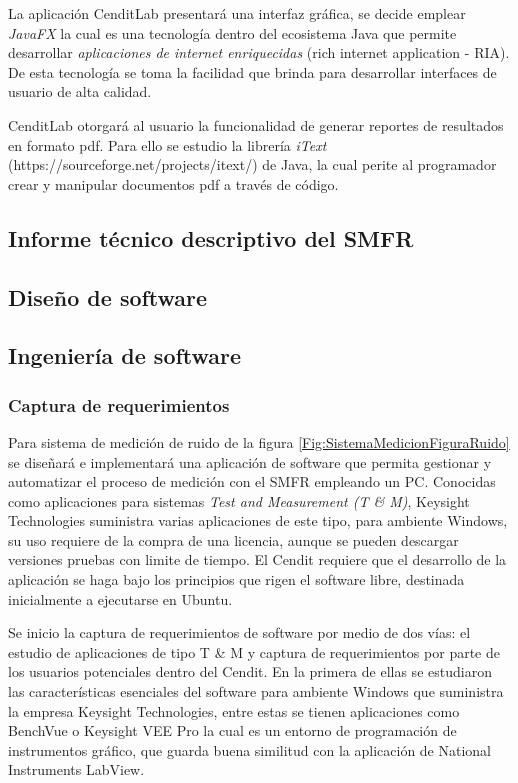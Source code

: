 \documentclass[paper=letter,oneside,fontsize=12pt, parskip=full]{article}
\begin{document}
	La aplicación CenditLab presentará una interfaz gráfica, se decide emplear \emph{JavaFX} la cual es una tecnología dentro del ecosistema Java que permite desarrollar \emph{aplicaciones de internet enriquecidas} (rich internet application - RIA). De esta tecnología se toma la facilidad que brinda para desarrollar interfaces de usuario de alta calidad.
	
	CenditLab otorgará al usuario la funcionalidad de generar reportes de resultados en formato pdf. Para ello se estudio la librería \emph{iText} (https://sourceforge.net/projects/itext/) de Java, la cual perite al programador crear y manipular documentos pdf a través de código.	
	
	\subsection{Informe técnico descriptivo del SMFR}	
	
	\subsection{Diseño de software}
	
	\subsection{Ingeniería de software}	
	
	\subsubsection{Captura de requerimientos}
	
	Para sistema de medición de ruido de la figura \ref{Fig:SistemaMedicionFiguraRuido} se diseñará e implementará una aplicación de software que permita gestionar y automatizar el proceso de medición con el SMFR empleando un PC. Conocidas como aplicaciones para sistemas \emph{Test and Measurement (T \& M)}, Keysight Technologies suministra varias aplicaciones de este tipo, para ambiente Windows, su uso requiere de la compra de una licencia, aunque se pueden descargar versiones pruebas con limite de tiempo. El Cendit requiere que el desarrollo de la aplicación se haga bajo los principios que rigen el software libre, destinada inicialmente a ejecutarse en Ubuntu.	
	
	Se inicio la captura de requerimientos de software por medio de dos vías: el estudio de aplicaciones de tipo T \& M y captura de requerimientos por parte de los usuarios potenciales dentro del Cendit. En la primera de ellas se estudiaron las características esenciales del software para ambiente Windows que suministra la empresa Keysight Technologies, entre estas se tienen aplicaciones como BenchVue o Keysight VEE Pro la cual es un entorno de programación de instrumentos gráfico, que  guarda buena similitud con la aplicación de National Instruments LabView. 	
	
\end{document}
